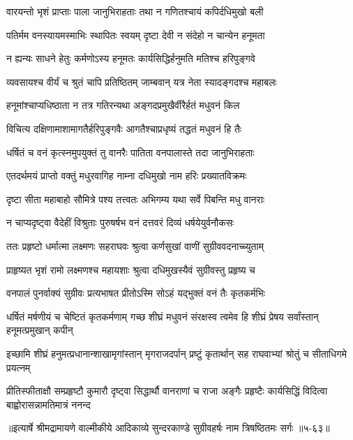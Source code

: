 \twolineshloka
{वारयन्तो भृशं प्राप्ताः पाला जानुभिराहताः}
{तथा न गणितश्चायं कपिर्दधिमुखो बली} %

\twolineshloka
{पतिर्मम वनस्यायमस्माभिः स्थापितः स्वयम्}
{दृष्टा देवी न संदेहो न चान्येन हनूमता} %

\twolineshloka
{न ह्यन्यः साधने हेतुः कर्मणोऽस्य हनूमतः}
{कार्यसिद्धिर्हनुमति मतिश्च हरिपुङ्गवे} %

\twolineshloka
{व्यवसायश्च वीर्यं च श्रुतं चापि प्रतिष्ठितम्}
{जाम्बवान् यत्र नेता स्यादङ्गदश्च महाबलः} %

\twolineshloka
{हनूमांश्चाप्यधिष्ठाता न तत्र गतिरन्यथा}
{अङ्गदप्रमुखैर्वीरैर्हतं मधुवनं किल} %

\twolineshloka
{विचित्य दक्षिणामाशामागतैर्हरिपुङ्गवैः}
{आगतैश्चाप्रधृष्यं तद्धतं मधुवनं हि तैः} %

\twolineshloka
{धर्षितं च वनं कृत्स्नमुपयुक्तं तु वानरैः}
{पातिता वनपालास्ते तदा जानुभिराहताः} %

\twolineshloka
{एतदर्थमयं प्राप्तो वक्तुं मधुरवागिह}
{नाम्ना दधिमुखो नाम हरिः प्रख्यातविक्रमः} %

\twolineshloka
{दृष्टा सीता महाबाहो सौमित्रे पश्य तत्त्वतः}
{अभिगम्य यथा सर्वे पिबन्ति मधु वानराः} %

\twolineshloka
{न चाप्यदृष्ट्वा वैदेहीं विश्रुताः पुरुषर्षभ}
{वनं दत्तवरं दिव्यं धर्षयेयुर्वनौकसः} %

\twolineshloka
{ततः प्रहृष्टो धर्मात्मा लक्ष्मणः सहराघवः}
{श्रुत्वा कर्णसुखां वाणीं सुग्रीववदनाच्च्युताम्} %

\twolineshloka
{प्राहृष्यत भृशं रामो लक्ष्मणश्च महायशाः}
{श्रुत्वा दधिमुखस्यैवं सुग्रीवस्तु प्रहृष्य च} %

\twolineshloka
{वनपालं पुनर्वाक्यं सुग्रीवः प्रत्यभाषत}
{प्रीतोऽस्मि सोऽहं यद्भुक्तं वनं तैः कृतकर्मभिः} %

\threelineshloka
{धर्षितं मर्षणीयं च चेष्टितं कृतकर्मणाम्}
{गच्छ शीघ्रं मधुवनं संरक्षस्व त्वमेव हि}
{शीघ्रं प्रेषय सर्वांस्तान् हनूमत्प्रमुखान् कपीन्} %

\twolineshloka
{इच्छामि शीघ्रं हनुमत्प्रधानान्शाखामृगांस्तान् मृगराजदर्पान्}
{प्रष्टुं कृतार्थान् सह राघवाभ्यां श्रोतुं च सीताधिगमे प्रयत्नम्} %

\twolineshloka
{प्रीतिस्फीताक्षौ सम्प्रहृष्टौ कुमारौ दृष्ट्वा सिद्धार्थौ वानराणां च राजा}
{अङ्गैः प्रहृष्टैः कार्यसिद्धिं विदित्वा बाह्वोरासन्नामतिमात्रं ननन्द} %


॥इत्यार्षे श्रीमद्रामायणे वाल्मीकीये आदिकाव्ये सुन्दरकाण्डे सुग्रीवहर्षः नाम त्रिषष्ठितमः सर्गः ॥५-६३॥
